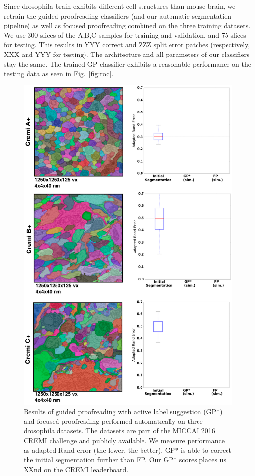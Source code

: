 Since drosophila brain exhibits different cell structures than mouse brain, we retrain the guided proofreading classifiers (and our automatic segmentation pipeline) as well as focused proofreading combined on the three training datasets. We use 300 slices of the A,B,C samples for training and validation, and 75 slices for testing. This results in YYY correct and ZZZ split error patches (respectively, XXX and YYY for testing). The architecture and all parameters of our classifiers stay the same. The trained GP classifier exhibits a reasonable performance on the testing data as seen in Fig.~\ref{fig:roc}.

\begin{figure}[h]
\begin{center}
  \includegraphics[width=\linewidth]{gfx/results_fruitfly.png}
\end{center}
  \vspace{-4mm}
   \caption{Results of guided proofreading with active label suggestion (GP*) and focused proofreading performed automatically on three drosophila datasets. The datasets are part of the MICCAI 2016 CREMI challenge and publicly available. We measure performance as adapted Rand error (the lower, the better). GP* is able to correct the initial segmentation further than FP. Our GP* scores places us XXnd on the CREMI leaderboard.}
\label{fig:results_fruitfly}
\end{figure}

